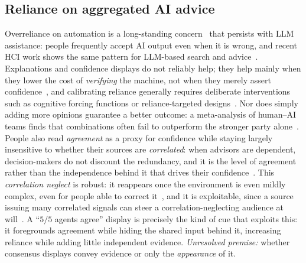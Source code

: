 \documentclass[acmsmall,screen,review,anonymous]{acmart}
\begin{document}
\subsection{Reliance on aggregated AI advice}
Overreliance on automation is a long-standing concern~\cite{parasuraman1997,skitka1999} that persists with
LLM assistance: people frequently accept AI output even when it is wrong, and recent HCI work shows the same
pattern for LLM-based search and advice~\cite{spatharioti2025llmsearch}. Explanations and confidence displays
do not reliably help; they help mainly when they lower the cost of \emph{verifying} the machine, not when
they merely assert confidence~\cite{vasconcelos2023explanations,bansal2021whole}, and calibrating reliance
generally requires deliberate interventions such as cognitive forcing functions or reliance-targeted
designs~\cite{buccinca2021trust,bo2025rely}. Nor does simply adding more opinions
guarantee a better outcome: a meta-analysis of human--AI teams finds that combinations often fail to
outperform the stronger party alone~\cite{vaccaro2024combinations}. People also read \emph{agreement} as a
proxy for confidence while staying largely insensitive to whether their sources are \emph{correlated}: when
advisors are dependent, decision-makers do not discount the redundancy, and it is the level of agreement
rather than the independence behind it that drives their confidence~\cite{budescu2007aggregation}. This
\emph{correlation neglect} is robust: it reappears once the environment is even mildly complex, even for
people able to correct it~\cite{enke2019correlation}, and it is exploitable, since a source issuing many
correlated signals can steer a correlation-neglecting audience at will~\cite{levy2022persuasion}. A
``$5/5$ agents agree'' display is precisely the kind of cue that exploits this: it foregrounds agreement
while hiding the shared input behind it, increasing reliance while adding little independent evidence.
\emph{Unresolved premise:} whether consensus displays convey evidence or only the \emph{appearance} of it.
\end{document}
